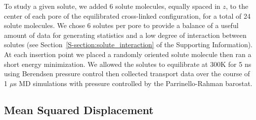 \documentclass[journal=jpcbfk,manuscript=article]{achemso}
\begin{document}

  To study a given solute, we added 6 solute molecules, equally spaced in $z$, to the
  center of each pore of the equilibrated cross-linked configuration, for a total of 24
  solute molecules. We chose 6 solutes per pore to provide a balance of a useful amount of 
  data for generating statistics and a low degree of interaction between solutes (see 
  Section~\ref{S-section:solute_interaction} of the Supporting Information). At each
  insertion point we placed a randomly oriented solute molecule then ran a short 
  energy minimization. We allowed the solutes to equilibrate at 300K for 5 ns using Berendsen
  pressure control then collected transport data over the course of 1 $\mu$s MD simulations
  with pressure controlled by the Parrinello-Rahman barostat.

  \subsection{Mean Squared Displacement}\label{method:MSD}
\end{document}
